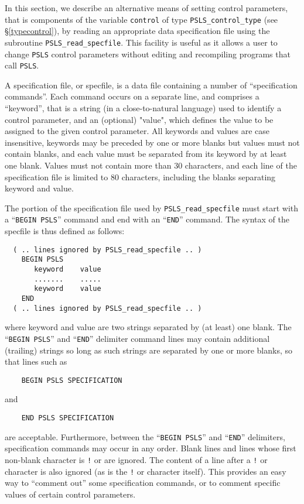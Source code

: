 \documentclass{galahad}
\newcommand{\packagename}{PSLS}
\begin{document}

\galfeatures
\noindent In this section, we describe an alternative means of setting
control parameters, that is components of the variable {\tt control} of type
{\tt \packagename\_control\_type}
(see \S\ref{typecontrol}),
by reading an appropriate data specification file using the
subroutine {\tt \packagename\_read\_specfile}. This facility
is useful as it allows a user to change  {\tt \packagename} control parameters
without editing and recompiling programs that call {\tt \packagename}.

A specification file, or specfile, is a data file containing a number of
``specification commands''. Each command occurs on a separate line,
and comprises a ``keyword'',
that is a string (in a close-to-natural language) used to identify a
control parameter, and
an (optional) "value", which defines the value to be assigned to the given
control parameter. All keywords and values are case insensitive,
keywords may be preceded by one or more blanks but
values must not contain blanks, and
each value must be separated from its keyword by at least one blank.
Values must not contain more than 30 characters, and
each line of the specification file is limited to 80 characters,
including the blanks separating keyword and value.

The portion of the specification file used by
{\tt \packagename\_read\_specfile}
must start
with a ``{\tt BEGIN \packagename}'' command and end with an
``{\tt END}'' command.  The syntax of the specfile is thus defined as follows:
\begin{verbatim}
  ( .. lines ignored by PSLS_read_specfile .. )
    BEGIN PSLS
       keyword    value
       .......    .....
       keyword    value
    END
  ( .. lines ignored by PSLS_read_specfile .. )
\end{verbatim}
where keyword and value are two strings separated by (at least) one blank.
The ``{\tt BEGIN \packagename}'' and ``{\tt END}'' delimiter command lines
may contain additional (trailing) strings so long as such strings are
separated by one or more blanks, so that lines such as
\begin{verbatim}
    BEGIN PSLS SPECIFICATION
\end{verbatim}
and
\begin{verbatim}
    END PSLS SPECIFICATION
\end{verbatim}
are acceptable. Furthermore,
between the
``{\tt BEGIN \packagename}'' and ``{\tt END}'' delimiters,
specification commands may occur in any order.  Blank lines and
lines whose first non-blank character is {\tt !} or {\tt *} are ignored.
The content
of a line after a {\tt !} or {\tt *} character is also
ignored (as is the {\tt !} or {\tt *}
character itself). This provides an easy way to ``comment out'' some
specification commands, or to comment specific values
of certain control parameters.
\end{document}
